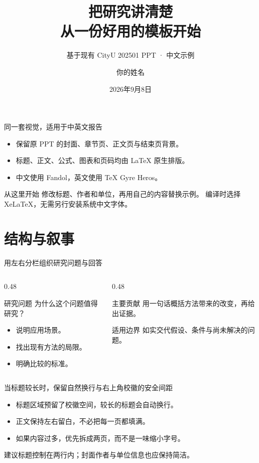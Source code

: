 \documentclass[aspectratio=169,11pt,t]{beamer}
\title[CityU Beamer · 中文示例]{把研究讲清楚\\从一份好用的模板开始}
\subtitle{基于现有 CityU 202501 PPT · 中文示例}
\author{你的姓名}
\institute{学院／学系／研究团队\\香港城市大学}
\date{2026年9月8日}
\begin{document}
\cityutitlepage

\begin{frame}{同一套视觉，适用于中英文报告}
  \begin{itemize}
    \item 保留原 PPT 的封面、章节页、正文页与结束页背景。
    \item 标题、正文、公式、图表和页码均由 \LaTeX{} 原生排版。
    \item 中文使用 Fandol，英文使用 TeX Gyre Heros。
  \end{itemize}
  \medskip
  \begin{block}{从这里开始}
    修改标题、作者和单位，再用自己的内容替换示例。
    编译时选择 XeLaTeX，无需另行安装系统中文字体。
  \end{block}
\end{frame}

\section{结构与叙事}

\begin{frame}{用左右分栏组织研究问题与回答}
  \begin{columns}[T,onlytextwidth]
    \begin{column}{0.48\textwidth}
      \begin{block}{研究问题}
        为什么这个问题值得研究？
      \end{block}
      \begin{itemize}
        \item 说明应用场景。
        \item 找出现有方法的局限。
        \item 明确比较的标准。
      \end{itemize}
    \end{column}
    \begin{column}{0.48\textwidth}
      \begin{exampleblock}{主要贡献}
        用一句话概括方法带来的改变，再给出证据。
      \end{exampleblock}
      \begin{alertblock}{适用边界}
        如实交代假设、条件与尚未解决的问题。
      \end{alertblock}
    \end{column}
  \end{columns}
\end{frame}

\begin{frame}{当标题较长时，保留自然换行与右上角校徽的安全间距}
  \begin{itemize}
    \item 标题区域预留了校徽空间，较长的标题会自动换行。
    \item 正文保持左右留白，不必把每一页都填满。
    \item 如果内容过多，优先拆成两页，而不是一味缩小字号。
  \end{itemize}
  \medskip
  {\small 建议标题控制在两行内；封面作者与单位信息也应保持简洁。}
\end{frame}
\end{document}
